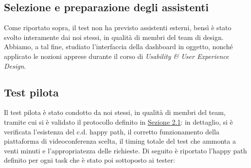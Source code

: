 \subsection{Selezione e preparazione degli assistenti}
\label{ss:selezione-preparazione-assistenti}
Come riportato sopra, il test non ha previsto assistenti esterni, bensì è stato svolto interamente dai noi stessi, in qualità di membri del team di design. Abbiamo, a tal fine, studiato l'interfaccia della dashboard in oggetto, nonché applicato le nozioni apprese durante il corso di \textit{Usability \& User Experience Design}.

\subsection{Test pilota}
Il test pilota è stato condotto da noi stessi, in qualità di membri del team, tramite cui si è validato il protocollo definito in \hyperref[ss:vre-progettazione-test]{Sezione 2.1}: in dettaglio, si è verificata l'esistenza del c.d. happy path, il corretto funzionamento della piattaforma di videoconferenza scelta, il timing totale del test che ammonta a venti minuti e l'appropriatezza delle richieste.
\noindent
Di seguito è riportato l'happy path definito per ogni task che è stato poi sottoposto ai tester:
